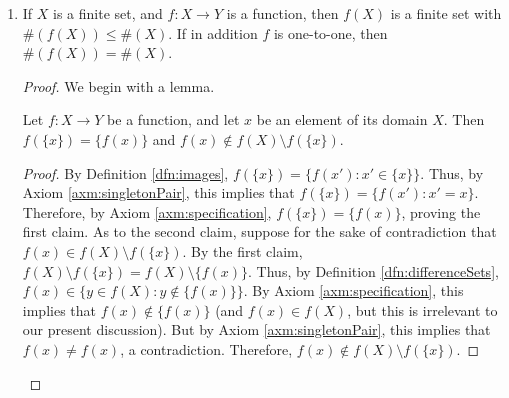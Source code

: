 \documentclass[../main.tex]{subfiles}
\begin{document}
\begin{enumerate}[ref={\thesection.\arabic*}]
\begin{prp}
\begin{enumerate}[label={\textup{(}\alph*\textup{)}},ref={\theenumi\alph*}]
\begin{proof}
                \medskip
                As to the second part of the question, let $X$ be a finite set, let $Y\subsetneq X$, and let $x$ be an element of $X$ that is not an element of $Y$ (the existence of such an element is discussed in the proof of Lemma \ref{lem:unionSubsetsNeq}). For this proof, we derive two simple inequalities and then combine them to yield the desired claim. Let's begin.
                \begin{enumerate}[label={(\arabic*)}]
                    \item By Definition \ref{dfn:subsets}, $Y\subsetneq X \Longrightarrow Y\subseteq X$. Thus, by the proof of the first part of this question, $Y$ is finite. This and the fact that $x\notin Y$ imply by Exercise \ref{exr:3.6.4a} that $\#(Y\cup\{x\})=\#(Y)+1$. Therefore, by Exercise \ref{exr:2.2.3f}, $\#(Y)<\#(Y\cup\{x\})$.
                    \item By the proof of Lemma \ref{lem:3.6.4a-mod}, $\{x\}\subseteq X$. Since we also have $Y\subseteq X$, Exercise \ref{exr:3.1.7} implies that $Y\cup\{x\}\subseteq X$. Therefore, by the proof of the first part of the question, $\#(Y\cup\{x\})\leq\#(X)$.
                \end{enumerate}
                Therefore, since (1) tells us that $\#(Y)<\#(Y\cup\{x\})$ and (2) tells us that $\#(Y\cup\{x\})\leq\#(X)$, we have that $\#(Y)<\#(Y\cup\{x\})\leq\#(X)$, i.e., $\#(Y)<\#(X)$, as desired.
            \end{proof}
            \item \label{exr:3.6.4d}If $X$ is a finite set, and $f:X\to Y$ is a function, then $f(X)$ is a finite set with $\#(f(X))\leq\#(X)$. If in addition $f$ is one-to-one, then $\#(f(X))=\#(X)$.
            \begin{proof}
                We begin with a lemma.
                \begin{lem}\label{lem:singletonSetImage}
                    Let $f:X\to Y$ be a function, and let $x$ be an element of its domain $X$. Then $f(\{x\})=\{f(x)\}$ and $f(x)\notin f(X)\setminus f(\{x\})$.
                    \begin{proof}
                        By Definition \ref{dfn:images}, $f(\{x\})=\{f(x'):x'\in\{x\}\}$. Thus, by Axiom \ref{axm:singletonPair}, this implies that $f(\{x\})=\{f(x'):x'=x\}$. Therefore, by Axiom \ref{axm:specification}, $f(\{x\})=\{f(x)\}$, proving the first claim. As to the second claim, suppose for the sake of contradiction that $f(x)\in f(X)\setminus f(\{x\})$. By the first claim, $f(X)\setminus f(\{x\})=f(X)\setminus\{f(x)\}$. Thus, by Definition \ref{dfn:differenceSets}, $f(x)\in\{y\in f(X):y\notin\{f(x)\}\}$. By Axiom \ref{axm:specification}, this implies that $f(x)\notin\{f(x)\}$ (and $f(x)\in f(X)$, but this is irrelevant to our present discussion). But by Axiom \ref{axm:singletonPair}, this implies that $f(x)\neq f(x)$, a contradiction. Therefore, $f(x)\notin f(X)\setminus f(\{x\})$.

\end{proof}
\end{lem}
\end{proof}
\end{enumerate}
\end{prp}
\end{enumerate}
\end{document}
